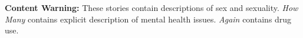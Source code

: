 \null

\vfill

\noindent \textbf{Content Warning:} These stories contain descriptions of sex and sexuality. \emph{How Many} contains explicit description of mental health issues. \emph{Again} contains drug use.
